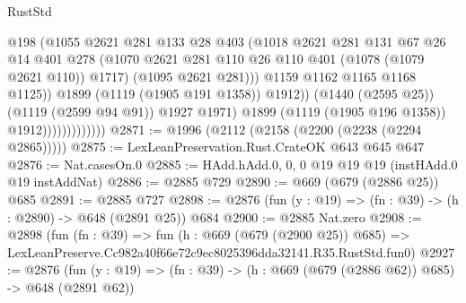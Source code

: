 \begin{lexlean}{RustStd}
\begin{coremodule}
                                        @198
                                        (@1055
                                          @2621
                                          @281
                                          @133
                                          @28
                                          @403
                                          (@1018
                                            @2621
                                            @281
                                            @131
                                            @67
                                            @26
                                            @14
                                            @401
                                            @278
                                            (@1070
                                              @2621
                                              @281
                                              @110
                                              @26
                                              @110
                                              @401
                                              (@1078 (@1079 @2621 @110))
                                              @1717)
                                            (@1095 @2621 @281)))
                                        @1159
                                        @1162
                                        @1165
                                        @1168
                                        @1125))
                                    @1899
                                    (@1119 (@1905 @191 @1358))
                                    @1912))
                                (@1440 (@2595 @25))
                                (@1119 (@2599 @94 @91))
                                @1927
                                @1971)
                              @1899
                              (@1119 (@1905 @196 @1358))
                              @1912)))))))))))))
@2871 := @1996 (@2112 (@2158 (@2200 (@2238 (@2294 @2865)))))
@2875 := LexLeanPreservation.Rust.CrateOK @643 @645 @647
@2876 := Nat.casesOn.{0}
@2885 := HAdd.hAdd.{0, 0, 0} @19 @19 @19 (instHAdd.{0} @19 instAddNat)
@2886 := @2885 @729
@2890 := @669 (@679 (@2886 @25)) @685
@2891 := @2885 @727
@2898 := @2876 (fun (y : @19) => (fn : @39) -> (h : @2890) -> @648 (@2891 @25)) @684
@2900 := @2885 Nat.zero
@2908 := @2898
    (fun (fn : @39) =>
    fun (h : @669 (@679 (@2900 @25)) @685) =>
    LexLeanPreserve.Cc982a40f66e72c9ec8025396dda32141.R35.RustStd.fun0)
@2927 := @2876
    (fun (y : @19) => (fn : @39) -> (h : @669 (@679 (@2886 @62)) @685) -> @648 (@2891 @62))

\end{coremodule}
\end{lexlean}
